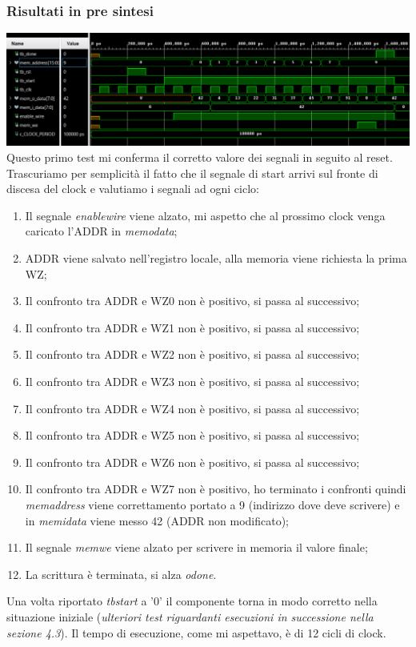 \documentclass{article}
\begin{document}
\subsubsection{Risultati in pre sintesi}
\includegraphics[width=\textwidth]{tb0.png}
Questo primo test mi conferma il corretto valore dei segnali in seguito al reset.
Trascuriamo per semplicità il fatto che il segnale di start arrivi sul fronte di discesa del clock e valutiamo i segnali ad ogni ciclo:
\begin{enumerate}
	\item Il segnale \textit{enable\textunderscore wire} viene alzato, mi aspetto che al prossimo clock venga caricato l'ADDR in \textit{mem\textunderscore o\textunderscore data};
	\item ADDR viene salvato nell'registro locale, alla memoria viene richiesta la prima WZ;
	\item Il confronto tra ADDR e WZ0 non è positivo, si passa al successivo;
	\item Il confronto tra ADDR e WZ1 non è positivo, si passa al successivo;
	\item Il confronto tra ADDR e WZ2 non è positivo, si passa al successivo;
	\item Il confronto tra ADDR e WZ3 non è positivo, si passa al successivo;
	\item Il confronto tra ADDR e WZ4 non è positivo, si passa al successivo;
	\item Il confronto tra ADDR e WZ5 non è positivo, si passa al successivo;
	\item Il confronto tra ADDR e WZ6 non è positivo, si passa al successivo;
	\item Il confronto tra ADDR e WZ7 non è positivo, ho terminato i confronti quindi \textit{mem\textunderscore address} viene correttamento portato a 9 (indirizzo dove deve scrivere) e in \textit{mem\textunderscore i\textunderscore data} viene messo 42 (ADDR non modificato);
	\item Il segnale \textit{mem\textunderscore we} viene alzato per scrivere in memoria il valore finale;
	\item La scrittura è terminata, si alza \textit{o\textunderscore done}.
\end{enumerate}
Una volta riportato \textit{tb\textunderscore start} a '0' il componente torna in modo corretto nella situazione iniziale (\textit{ulteriori test riguardanti esecuzioni in successione nella sezione 4.3}).
Il tempo di esecuzione, come mi aspettavo, è di 12 cicli di clock.
\end{document}
